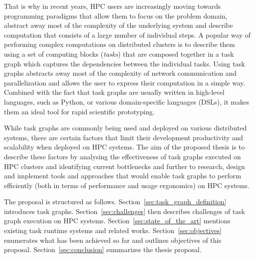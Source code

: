 That is why in recent years, HPC users are increasingly moving towards programming paradigms that
allow them to focus on the problem domain, abstract away most of the complexity of the underlying
system and describe computation that consists of a large number of individual steps.
A popular way of performing complex computations on distributed clusters is to describe them
using a set of computing blocks (\emph{tasks}) that are composed together in a task graph
which captures the dependencies between the individual tasks. Using task graphs abstracts away most
of the complexity of network communication and parallelization and allows the user to
express their computation in a simple way. Combined with the fact that task graphs are usually written
in high-level languages, such as Python, or various domain-specific languages (DSLs), it makes them
an ideal tool for rapid scientific prototyping.

While task graphs are commonly being used and deployed on various distributed systems, there are
certain factors that limit their development productivity and scalability when deployed on HPC
systems. The aim of the proposed thesis is to describe these factors by analysing the effectiveness
of task graphs executed on HPC clusters and identifying current bottlenecks and
further to research, design and implement tools and approaches that would enable task graphs to
perform efficiently (both in terms of performance and usage ergonomics) on HPC systems.

The proposal is structured as follows. Section~\ref{sec:task_graph_definition} introduces task
graphs. Section~\ref{sec:challenges} then describes challenges of task graph execution on HPC
systems. Section~\ref{sec:state_of_the_art} mentions existing task runtime systems and related
works. Section~\ref{sec:objectives} enumerates what has been achieved so far and outlines
objectives of this proposal. Section~\ref{sec:conclusion} summarizes the thesis proposal.
